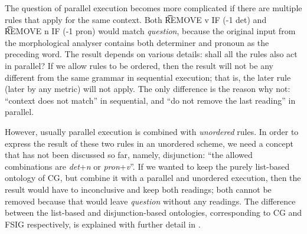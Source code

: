 The question of parallel execution becomes more complicated if 
there are multiple rules that apply for the same context. 
Both \t{REMOVE v IF (-1 det)} and \t{REMOVE n IF (-1 pron)} 
would match \emph{question}, because the original input 
from the morphological analyser contains both determiner and 
pronoun as the preceding word. 
The result depends on various details: shall all the rules also act in parallel?
If we allow rules to be ordered, then the result will not be any different from 
the same grammar in sequential execution; that is, the later rule (later by any metric) 
will not apply. 
The only difference is the reason why not: ``context does not match'' in sequential,  
and ``do not remove the last reading'' in parallel.

However, usually parallel execution is combined with \emph{unordered} rules.
In order to express the result of these two rules in an unordered scheme, we need a concept 
that has not been discussed so far, namely, disjunction:
``the allowed combinations are {\em det}+{\em n} or {\em pron}+{\em v}''. 
If we wanted to keep the purely list-based ontology of CG, but combine it with a parallel 
and unordered execution, then the result would have to inconclusive and keep both readings; 
both cannot be removed because that would leave {\em question} without any readings.
The difference between the list-based and disjunction-based ontologies, corresponding to 
CG and FSIG respectively, is explained with further detail in \cite{lager_nivre01}.




